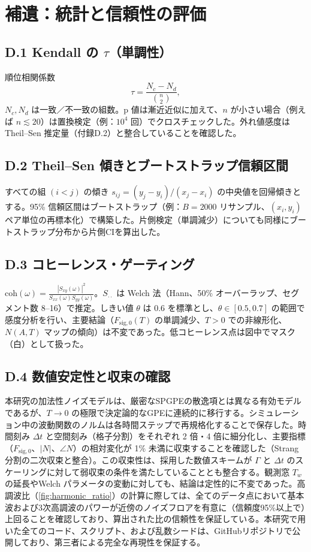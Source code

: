 \documentclass[a4paper,11pt,ja=standard,lualatex]{bxjsarticle}
\newcommand{\figref}[1]{\cref{#1}}
\begin{document}
\section{補遺：統計と信頼性の評価}
\label{sec:appendixD}
\subsection*{D.1 Kendall の $\tau$（単調性）}
順位相関係数
\begin{equation}
 \tau = \frac{N_c - N_d}{\binom{n}{2}},
\end{equation}
$N_c,N_d$ は一致／不一致の組数。p 値は漸近近似に加えて、$n$ が小さい場合（例えば $n\lesssim 20$）は置換検定（例：$10^4$ 回）でクロスチェックした\cite{Kendall1938}。外れ値感度は Theil--Sen 推定量（付録D.2）と整合していることを確認した。

\subsection*{D.2 Theil--Sen 傾きとブートストラップ信頼区間}
すべての組 $(i<j)$ の傾き $s_{ij}=(y_j-y_i)/(x_j-x_i)$ の中央値を回帰傾きとする。95\% 信頼区間はブートストラップ（例：$B=2000$ リサンプル、$(x_i,y_i)$ ペア単位の再標本化）で構築した\cite{Sen1968,Efron1979}。片側検定（単調減少）についても同様にブートストラップ分布から片側CIを算出した。

\subsection*{D.3 コヒーレンス・ゲーティング}
$\mathrm{coh}(\omega)=\frac{|S_{xy}(\omega)|^2}{S_{xx}(\omega)S_{yy}(\omega)}$。$S_{\cdot\cdot}$ は Welch 法（Hann、50\% オーバーラップ、セグメント数 8--16）で推定。しきい値 $\theta$ は 0.6 を標準とし、$\theta\in[0.5,0.7]$ の範囲で感度分析を行い、主要結論（$F_{\mathrm{sig},0}(T)$ の単調減少、$T>0$ での非線形化、$N(A,T)$ マップの傾向）は不変であった\cite{Welch1967,BendatPiersol2010}。低コヒーレンス点は図中でマスク（白）として扱った。

\subsection*{D.4 数値安定性と収束の確認}
本研究の加法性ノイズモデルは、厳密なSPGPEの散逸項とは異なる有効モデルであるが、$T \to 0$ の極限で決定論的なGPEに連続的に移行する。シミュレーション中の波動関数のノルムは各時間ステップで再規格化することで保存した。時間刻み $\Delta t$ と空間刻み（格子分割）をそれぞれ 2 倍・4 倍に細分化し、主要指標（$F_{\mathrm{sig},0}$、$|N|$、$\angle N$）の相対変化が 1\% 未満に収束することを確認した（Strang 分割の二次収束と整合）。この収束性は、採用した数値スキームが $\Gamma$ と $\Delta t$ のスケーリングに対して弱収束の条件を満たしていることとも整合する。観測窓 $T_w$ の延長やWelch パラメータの変動に対しても、結論は定性的に不変であった。高調波比（\figref{fig:harmonic_ratio}）の計算に際しては、全てのデータ点において基本波および3次高調波のパワーが近傍のノイズフロアを有意に（信頼度95\%以上で）上回ることを確認しており、算出された比の信頼性を保証している。本研究で用いた全てのコード、スクリプト、および乱数シードは、GitHubリポジトリで公開しており、第三者による完全な再現性を保証する。
\end{document}
